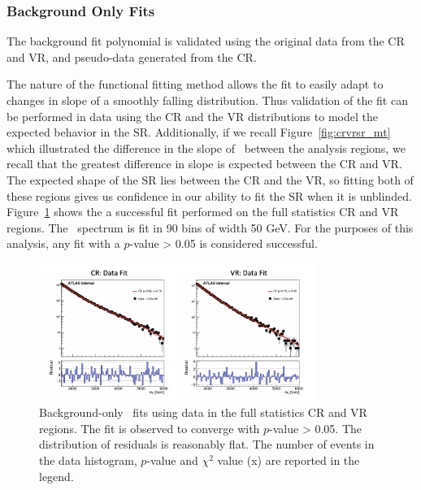 \subsubsection{Background Only Fits}
\label{subsec:fit_bkgonly}

The background fit polynomial is validated using the original data from the CR and VR, and pseudo-data generated from the CR.

The nature of the functional fitting method allows the fit to easily adapt to changes in slope of a smoothly falling distribution.
Thus validation of the fit can be performed in data using the CR and the VR distributions to model the expected behavior in the SR. 
Additionally, if we recall Figure~\ref{fig:crvrsr_mt} which illustrated the difference in the slope of \mt~between the analysis regions, we recall that the greatest difference in slope is expected between the CR and VR.
The expected shape of the SR lies between the CR and the VR, so fitting both of these regions gives us confidence in our ability to fit the SR when it is unblinded.
Figure~\ref{fig:bkgfit_data_fullstats} shows the a successful fit performed on the full statistics CR and VR regions.
The \mt~spectrum is fit in 90 bins of width 50 GeV. 
For the purposes of this analysis, any fit with a $p$-value > 0.05 is considered successful. 

\begin{figure}[!htbp]
\centering
   \includegraphics[width=0.8\textwidth]{figures/stats/bkgfit_data_fullstats}
    \caption{Background-only \mt~fits using data in the full statistics CR and VR regions. The fit is observed to converge with $p$-value > 0.05. The distribution of residuals is reasonably flat. The number of events in the data histogram, $p$-value and $\chi^2$ value (x) are reported in the legend. 
    \label{fig:bkgfit_data_fullstats}}
\end{figure}

